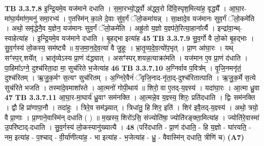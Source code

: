 \documentclass[17pt]{extarticle}
\begin{document}
{{{{{{{{{{{{{{{{{{{                  \newline
                                \textbf{ TB 3.3.7.8} \newline
                  इ॒न्द्रि॒यमे॒व यज॑माने दधाति । स॒मा॒रभ्यो॒र्द्ध्वो अ॑द्ध्व॒रो दि॑वि॒स्पृश॒मित्या॑ह॒ वृद्ध्यै᳚ । आ॒घा॒र-मा॑घा॒र्यमा॑ण॒मनु॑ समा॒रभ्य॑ । ए॒तस्मि॑न् का॒ले दे॒वाः सु॑व॒र्गं ॅलो॒कमा॑यन्न् । सा॒क्षादे॒व यज॑मानः सुव॒र्गं ॅलो॒कमे॑ति । अथो॒ समृ॑द्धेनै॒व य॒ज्ञेन॒ यज॑मानः सुव॒र्गं ॅलो॒कमे॑ति । अह्रु॑तो य॒ज्ञो य॒ज्ञ्प॑ते॒रित्या॒हाना᳚र्त्यै । इन्द्रा॑वा॒न्थ्-स्वाहेत्या॑ह । इ॒न्द्रि॒यमे॒व यज॑माने दधाति । बृ॒हद्भा इत्या॑ह \textbf{ 45} \newline
                  \newline
                                \textbf{ TB 3.3.7.9} \newline
                  सु॒व॒र्गो वै लो॒को बृ॒हद्भाः । सु॒व॒र्गस्य॑ लो॒कस्य॒ सम॑ष्ट्यै ॥ य॒ज॒मा॒न॒दे॒व॒त्या॑ वै जु॒हूः । भ्रा॒तृ॒व्य॒दे॒व॒त्यो॑प॒भृत् । प्रा॒ण आ॑घा॒रः । यथ् सꣳ॑स्प॒र्.शये᳚त् । भ्रातृ॑व्येऽस्य प्रा॒णं द॑द्ध्यात् । असꣳ॑स्पर्.शयन्न॒त्याक्रा॑मति । यज॑मान ए॒व प्रा॒णं द॑धाति । पा॒हिमा᳚ऽग्ने॒ दुश्च॑रिता॒दा मा॒ सुच॑रिते भ॒जेत्या॑ह \textbf{ 46} \newline
                  \newline
                                \textbf{ TB 3.3.7.10} \newline
                  अ॒ग्निर्वाव प॒वित्र᳚म् । वृ॒जि॒नमनृ॑तं॒ दुश्च॑रितम् । ऋ॒जु॒क॒र्मꣳ स॒त्यꣳ सुच॑रितम् । अ॒ग्निरे॒वैनं॑ ॅवृजि॒नाद-नृ॑ता॒द्-दुश्च॑रितात्पाति । ऋ॒जु॒क॒र्मे स॒त्ये सुच॑रिते भजति । तस्मा॑दे॒वमाशा᳚स्ते । आ॒त्मनो॑ गोपी॒थाय॑ ॥ शिरो॒ वा ए॒तद्-य॒ज्ञ्स्य॑ । यदा॑घा॒रः । आ॒त्मा ध्रु॒वा \textbf{ 47} \newline
                  \newline
                                \textbf{ TB 3.3.7.11} \newline
                  आ॒घा॒र-मा॒घार्य॑ ध्रु॒वाꣳ सम॑नक्ति । आ॒त्मन्ने॒व य॒ज्ञ्स्य॒ शिरः॒ प्रति॑दधाति । द्विः सम॑नक्ति । द्वौ हि प्रा॑णापा॒नौ । तदा॑हुः । त्रिरे॒व सम॑ञ्ज्यात् । त्रिधा॑तु॒ हि शिर॒ इति॑ । शिर॑ इवै॒तद्-य॒ज्ञ्स्य॑ । अथो॒ त्रयो॒ वै प्रा॒णाः । प्रा॒णाने॒वास्मि॑न् दधाति ( ) ॥ म॒खस्य॒ शिरो॑ऽसि॒ संज्योति॑षा॒ ज्योति॑रङ्क्ता॒मित्या॑ह । ज्योति॑रे॒वास्मा॑ उ॒परि॑ष्टाद्-दधाति । सु॒व॒र्गस्य॑ लो॒कस्यानु॑ख्यात्यै । \textbf{ 48} \newline
                  \newline
                                    (परि॑दधाति - प्रा॒णं द॑धाति॒ - हि य॒ज्ञो - घा॑रयति॒ - नम॒ इत्या॑ह - प॒श्चाद् - वी॒र्या॑णीत्या॑ह॒ - भा इत्या॑ह - भ॒जेत्या॑ह - ध्रु॒ - वैवास्मि॑न् दधाति॒ त्रीणि॑ च) \textbf{(A7)} \newline \newline
}}}}}}}}}}}}}}}}}}}
\end{document}
